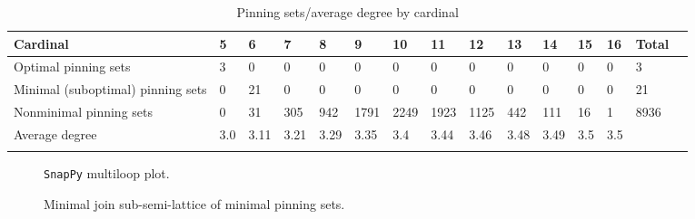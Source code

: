\documentclass{article}%
\begin{document}
\begin{table}[ht]
	\caption{Pinning sets/average degree by cardinal}
	\centering
	\renewcommand{\arraystretch}{1.5}
	\begin{tabularx}{\textwidth}{lXXXXXXXXXXXXXX}
		\toprule
			Cardinal & 5 & 6 & 7 & 8 & 9 & 10 & 11 & 12 & 13 & 14 & 15 & 16 & Total\\
			\hline
			Optimal pinning sets & 3 & 0 & 0 & 0 & 0 & 0 & 0 & 0 & 0 & 0 & 0 & 0 & 3 \\
			Minimal (suboptimal) pinning sets & 0 & 21 & 0 & 0 & 0 & 0 & 0 & 0 & 0 & 0 & 0 & 0 & 21 \\
			Nonminimal pinning sets & 0 & 31 & 305 & 942 & 1791 & 2249 & 1923 & 1125 & 442 & 111 & 16 & 1 & 8936 \\
			Average degree & 3.0 & 3.11 & 3.21 & 3.29 & 3.35 & 3.4 & 3.44 & 3.46 & 3.48 & 3.49 & 3.5 & 3.5 &  \\
		\bottomrule \\ 
	\end{tabularx}
\end{table}

\begin{multicols}{2}
\begin{figure}[H]
\centering

\caption{\texttt{SnapPy} multiloop plot.}
\label{fig:tex/img/[[10, 24, 1, 11], [11, 21, 12, 20], [9, 19, 10, 20], [23, 18, 24, 19], [1, 6, 2, 7], [21, 7, 22, 8], [12, 8, 13, 9], [13, 22, 14, 23], [17, 28, 18, 25], [5, 27, 6, 28], [2, 15, 3, 14], [25, 3, 26, 4],.svg}
\end{figure}
\columnbreak

\begin{figure}[H]
\centering
\scalebox{0.8}{}
\caption{Minimal join sub-semi-lattice of minimal pinning sets.}
\label{fig:tex/img/[[10, 24, 1, 11], [11, 21, 12, 20], [9, 19, 10, 20], [23, 18, 24, 19], [1, 6, 2, 7], [21, 7, 22, 8], [12, 8, 13, 9], [13, 22, 14, 23], [17, 28, 18, 25], [5, 27, 6, 28], [2, 15, 3, 14], [25, 3, 26, 4],.pgf}
\end{figure}
\end{multicols}
\end{document}
